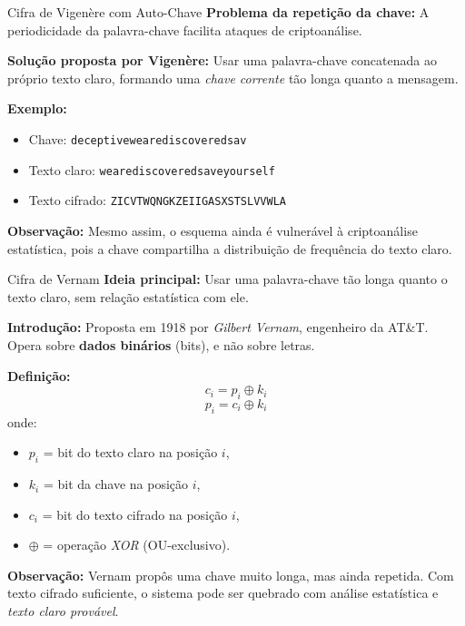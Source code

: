 \begin{frame}{Cifra de Vigenère com Auto-Chave}
\textbf{Problema da repetição da chave:}  
A periodicidade da palavra-chave facilita ataques de criptoanálise.

\medskip
\textbf{Solução proposta por Vigenère:}  
Usar uma palavra-chave concatenada ao próprio texto claro, formando uma \textit{chave corrente} tão longa quanto a mensagem.  

\medskip
\textbf{Exemplo:}  
\begin{itemize}
    \item Chave: \texttt{deceptivewearediscoveredsav}
    \item Texto claro: \texttt{wearediscoveredsaveyourself}
    \item Texto cifrado: \texttt{ZICVTWQNGKZEIIGASXSTSLVVWLA}
\end{itemize}

\medskip
\textbf{Observação:}  
Mesmo assim, o esquema ainda é vulnerável à criptoanálise estatística, pois a chave compartilha a distribuição de frequência do texto claro.
\end{frame}



\begin{frame}{Cifra de Vernam}
\textbf{Ideia principal:}  
Usar uma palavra-chave tão longa quanto o texto claro, sem relação estatística com ele.  

\medskip
\textbf{Introdução:}  
Proposta em 1918 por \textit{Gilbert Vernam}, engenheiro da AT\&T.  
Opera sobre \textbf{dados binários} (bits), e não sobre letras.  

\medskip
\textbf{Definição:}  
\[
c_i = p_i \oplus k_i
\]
\[
p_i = c_i \oplus k_i
\]
onde:
\begin{itemize}
    \item $p_i$ = bit do texto claro na posição $i$,
    \item $k_i$ = bit da chave na posição $i$,
    \item $c_i$ = bit do texto cifrado na posição $i$,
    \item $\oplus$ = operação \textit{XOR} (OU-exclusivo).
\end{itemize}

\medskip
\textbf{Observação:}  
Vernam propôs uma chave muito longa, mas ainda repetida.  
Com texto cifrado suficiente, o sistema pode ser quebrado com análise estatística e \textit{texto claro provável}.
\end{frame}

